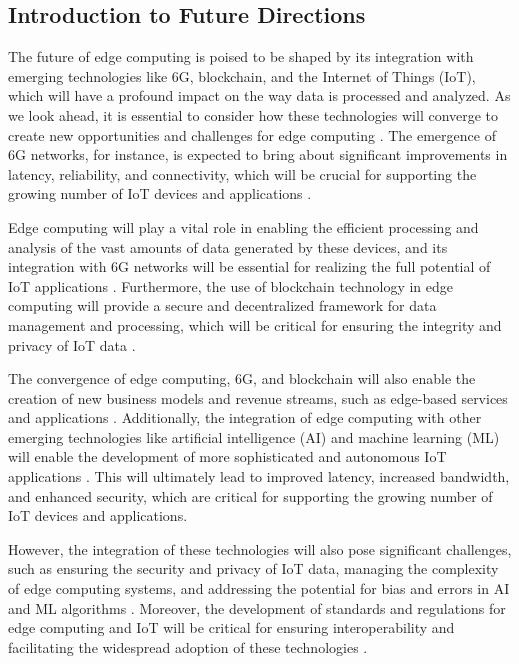 \documentclass[11pt]{article}
\begin{document}
\subsection{Introduction to Future Directions}

The future of edge computing is poised to be shaped by its integration with emerging technologies like 6G, blockchain, and the Internet of Things (IoT), which will have a profound impact on the way data is processed and analyzed. As we look ahead, it is essential to consider how these technologies will converge to create new opportunities and challenges for edge computing \cite{ref135}. The emergence of 6G networks, for instance, is expected to bring about significant improvements in latency, reliability, and connectivity, which will be crucial for supporting the growing number of IoT devices and applications \cite{ref17}.

Edge computing will play a vital role in enabling the efficient processing and analysis of the vast amounts of data generated by these devices, and its integration with 6G networks will be essential for realizing the full potential of IoT applications \cite{ref136}. Furthermore, the use of blockchain technology in edge computing will provide a secure and decentralized framework for data management and processing, which will be critical for ensuring the integrity and privacy of IoT data \cite{ref137}.

The convergence of edge computing, 6G, and blockchain will also enable the creation of new business models and revenue streams, such as edge-based services and applications \cite{ref138}. Additionally, the integration of edge computing with other emerging technologies like artificial intelligence (AI) and machine learning (ML) will enable the development of more sophisticated and autonomous IoT applications \cite{ref58}. This will ultimately lead to improved latency, increased bandwidth, and enhanced security, which are critical for supporting the growing number of IoT devices and applications.

However, the integration of these technologies will also pose significant challenges, such as ensuring the security and privacy of IoT data, managing the complexity of edge computing systems, and addressing the potential for bias and errors in AI and ML algorithms \cite{ref55}. Moreover, the development of standards and regulations for edge computing and IoT will be critical for ensuring interoperability and facilitating the widespread adoption of these technologies \cite{ref139}.
\end{document}
